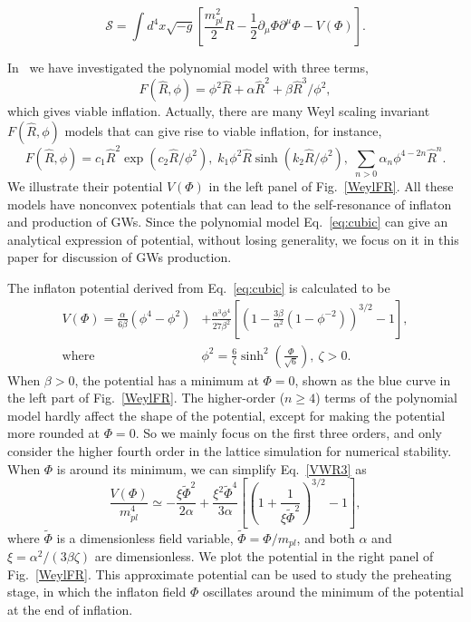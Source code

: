\documentclass[12pt, a4paper]{article}
\begin{document}
\begin{equation}
  \mathcal{S}=\int d^4x \sqrt{-g} \left[\frac{m_{pl}^2}{2}R-\frac{1}{2}\partial_{\mu}\Phi\partial^{\mu}\Phi-V\left(\Phi\right)\right].
\end{equation} 

In~\cite{Wang:2023hsb} we have investigated the polynomial model with three terms,
\begin{equation}\label{eq:cubic}
F(\hat{R},\phi)=\phi^2\hat{R}+\alpha\hat{R}^2+{\beta}\hat{R}^3/{\phi^2},
\end{equation}
which gives viable inflation. Actually, there are many Weyl scaling invariant $F(\hat{R},\phi)$ models that can give rise to viable inflation, for instance,
\begin{equation}
F(\hat{R},\phi)=c_1 \hat R^2\exp({c_2\hat R}/{\phi^2}),\; k_1\phi^2\hat R\sinh({k_2\hat R}/{\phi^2}), \;\sum_{n>0}\alpha_n\phi^{4-2n}\hat R^n.
\end{equation} 
We illustrate their potential $V(\Phi)$ in the left panel of Fig.~\ref{WeylFR}. All these models have nonconvex potentials that can lead to the self-resonance of inflaton and production of GWs. Since the polynomial model Eq.~\ref{eq:cubic} can give an analytical expression of potential, without losing generality, we focus on it in this paper for discussion of GWs production.

The inflaton potential derived from Eq.~\ref{eq:cubic} is calculated to be
\begin{equation}
	\begin{aligned}
		V(\Phi)=\frac{\alpha}{6\beta}\left(\phi^4-\phi^2\right)&+\frac{\alpha^3\phi^4}{27\beta^2}\left[\left(1-\frac{3\beta}{\alpha^2}\left(1-\phi^{-2}\right)\right)^{3/2}-1\right],\\
        \mathrm{where}~&\phi^2=\frac{6}{\zeta}\sinh^2\left(\frac{\Phi}{\sqrt 6}\right),~\zeta>0.
		\label{VWR3}
	\end{aligned}
\end{equation}
When $\beta>0$, the potential has a minimum at $\Phi=0$, shown as the blue curve in the left part of Fig.~\ref{WeylFR}. The higher-order ($n\geq4$) terms of the polynomial model hardly affect the shape of the potential, except for making the potential more rounded at $\Phi=0$. So we mainly focus on the first three orders, and only consider the higher fourth order in the lattice simulation for numerical stability. When $\Phi$ is around its minimum, we can simplify Eq.~\ref{VWR3} as
\begin{equation}
  \label{eq5}
  \frac{V\left(\Phi\right)}{m_{pl}^4}\simeq -\frac{\xi\tilde{\Phi}^2}{2\alpha}+\frac{\xi^2\tilde{\Phi}^4}{3\alpha}\left[\left(1+\frac{1}{\xi\tilde{\Phi}^2}\right)^{3/2}-1\right],
\end{equation}
where $\tilde{\Phi}$ is a dimensionless field variable, $\tilde{\Phi}={\Phi}/{m_{pl}}$, and both $\alpha$ and $\xi={\alpha^2}/{(3\beta\zeta)}$ are dimensionless. We plot the potential in the right panel of Fig.~\ref{WeylFR}. This approximate potential can be used to study the preheating stage, in which the inflaton field $\Phi$ oscillates around the minimum of the potential at the end of inflation.
\end{document}
